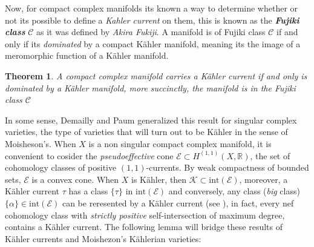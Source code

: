 \documentclass[12pt,twoside,a4paper]{report}
\newtheorem{theorem}{Theorem}[section]
\newcommand{\re}{\ensuremath{\mathbb R }}
\newcommand{\csheaf}{\ensuremath{\mathcal C }}
\begin{document}
Now, for compact complex manifolds its known a way to determine whether or not
its possible to define a \emph{Kahler current} on them, this is known as the
\emph{\bf Fujiki class} $\csheaf$ as it was defined by \emph{Akira Fukiji}. A
manifold is of Fujiki class $\csheaf$ if and only if its \emph{dominated} by a
compact Kähler manifold, meaning its the image of a meromorphic function of a
Kähler manifold.
\begin{theorem}
  A compact complex manifold carries a Kähler current if and only is dominated by a Kähler manifold, more succinctly, the manifold is in the Fujiki class $\csheaf$ 
  \end{theorem}
In some sense, Demailly and Paum generalized this result for singular complex varieties, the type of varieties that will turn out to be Kähler in the sense of Moisheson's.
When $X$ is a non singular compact complex manifold, it is convenient to cosider the \emph{pseudoeffective} cone $\mathcal{E}\subset H^{(1,1)}(X,\re)$, the set of cohomology classes of positive $(1,1)$-currents. By weak compactness of bounded sets, $\mathcal{E}$ is a convex cone. When $X$ is Kähler, then $\mathcal{K}\subset\mathrm{int}(\mathcal{E})$, moreover, a Kähler current $\tau$ has a class $\{\tau\}$ in $\mathrm{int}(\mathcal{E})$ and conversely, any class (\emph{big} class) $\{\alpha\}\in\mathrm{int}(\mathcal{E})$ can be reresented by a Kähler current (see \cite{Demailly-Paum}), in fact, every nef cohomology class with \emph{strictly positive} self-intersection of maximum degree, contains a Kähler current. The following lemma will bridge these results of Kähler currents and Moishezon's Kählerian varieties:
\end{document}
